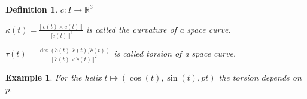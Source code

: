 \documentclass[]{article}
\newtheorem{definition}{Definition}
\newtheorem{example}{Example}
\begin{document}
\begin{definition}
	$c:I \rightarrow \mathbb{R}^3$
	
	$\kappa(t) = \frac{||\dot{c}(t) \times \ddot{c}(t)||}{||\dot{c}(t)||^3}$ is called the curvature of a space curve.
	
	$\tau(t) = \frac{\det (\dot{c}(t), \ddot{c}(t), \dddot{c}(t))}{||\dot{c}(t) \times \ddot{c}(t)||^2}$ is called torsion of a space curve.
\end{definition}

\begin{example}
	For the helix $t \mapsto (\cos(t), \sin(t), pt)$ the torsion depends on $p$.	
\end{example}
\end{document}
